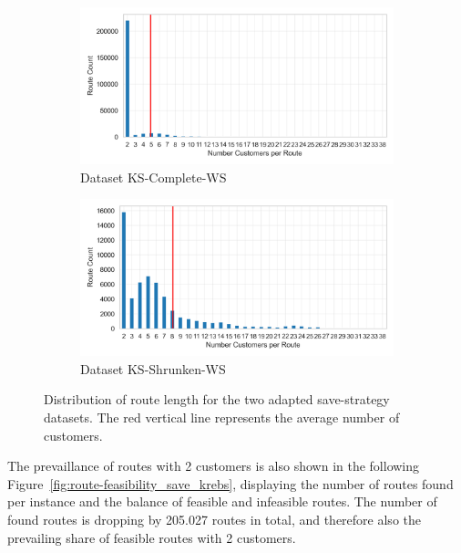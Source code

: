 \begin{figure}[ht]
	\centering
	\begin{subfigure}[t]{.5\textwidth}
		\centering
		\includegraphics[width=\linewidth]{pictures/dataset_structure/no_cust_plot_krebs_28880_600_WS.png}
		\caption{Dataset KS-Complete-WS}
		\label{fig:ds-a-krebs}
	\end{subfigure}%
	\begin{subfigure}[t]{.5\textwidth}
		\centering
		\includegraphics[width=\linewidth]{pictures/dataset_structure/no_cust_plot_krebs_28880_600_WS_Shrinked094.png}
		\caption{Dataset KS-Shrunken-WS}
		\label{fig:ds-b-krebs}
	\end{subfigure}
	\caption{Distribution of route length for the two adapted save-strategy datasets. The red vertical line represents the average
		number of customers.}
	\label{fig:route-dists_save_krebs}
\end{figure}

The prevaillance of routes with 2 customers is also shown in the following Figure~\ref{fig:route-feasibility_save_krebs}, displaying the number of routes found per instance and
the balance of feasible and infeasible routes. The number of found routes is dropping by 205.027 routes in total, and therefore
also the prevailing share of feasible routes with 2 customers.

